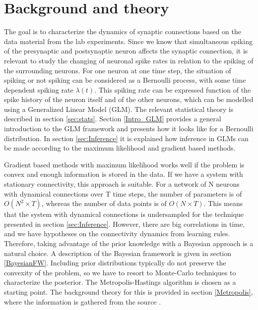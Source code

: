 
\chapter{Background and theory}
\label{ch:theory}

The goal is to characterize the dynamics of synaptic connections based on the data material from the lab experiments. Since we know that simultaneous spiking of the presynaptic and postsynaptic neuron affects the synaptic connection, it is relevant to study the changing of neuronal spike rates in relation to the spiking of the surrounding neurons. For one neuron at one time step, the situation of spiking or not spiking can be considered as a Bernoulli process, with some time dependent spiking rate $\lambda (t)$. This spiking rate can be expressed function of the spike history of the neuron itself and of the other neurons, which can be modelled using a Generalized Linear Model (GLM). The relevant statistical theory is described in section \ref{sec:stats}. Section \ref{Intro_GLM} provides a general introduction to the GLM framework and presents how it looks like for a Bernoulli distribution. In section \ref{sec:Inference} it is explained how inference in GLMs can be made according to the maximum likelihood and gradient based methods. 

Gradient based methods with maximum likelihood works well if the problem is convex and enough information is stored in the data. If we have a system with stationary connectivity, this approach is suitable. For a network of N neurons with dynamical connections over T time steps, the number of parameters is of $O(N^2 \times T)$, whereas the number of data points is of $O(N \times T)$. This means that the system with dynamical connections is undersampled for the technique presented in section \ref{sec:Inference}. However, there are big correlations in time, and we have hypotheses on the connectivity dynamics from learning rules. Therefore, taking advantage of the prior knowledge with a Bayesian approach is a natural choice. A description of the Bayesian framework is given in section \ref{BayesianFW}. Including prior distributions typically do not preserve the convexity of the problem, so we have to resort to Monte-Carlo techniques to characterize the posterior. The Metropolis-Hastings algorithm is chosen as a starting point. The background theory for this is provided in section \ref{Metropolis}, where the information is gathered from the source \cite{MC}.

